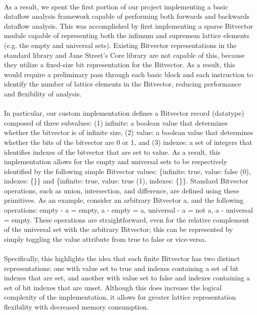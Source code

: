 \documentclass[letterpaper,11pt]{article}
\begin{document}
\paragraph{}
As a result, we spent the first portion of our project implementing a basic
dataflow analysis framework capable of performing both forwards and backwards
dataflow analysis. This was accomplished by first implementing a sparse
Bitvector module capable of representing both the infimum and supremem lattice
elements (e.g. the empty and universal sets). Existing Bitvector
representations in the standard library and Jane Street’s Core library are not
capable of this, because they utilize a fixed-size bit representation for the
Bitvector. As a result, this would require a preliminary pass through each
basic block and each instruction to identify the number of lattice elements in
the Bitvector, reducing performance and flexibility of analysis.

\paragraph{}
In particular, our custom implementation defines a Bitvector record (datatype)
composed of three subvalues: (1) infinite: a boolean value that determines
whether the bitvector is of infinite size, (2) value: a boolean value that
determines whether the bits of the bitvector are 0 or 1, and (3) indexes: a set
of integers that identifies indexes of the bitvector that are set to value. As
a result, this implementation allows for the empty and universal sets to be
respectively identified by the following simple Bitvector values: \{infinite:
true, value: false (0), indexes: \{\}\} and \{infinite: true, value: true (1),
indexes: \{\}\}. Standard Bitvector operations, such as union, intersection, and
difference, are defined using these primitives. As an example, consider an
arbitrary Bitvector a, and the following operations: empty - a = empty, a -
empty = a, universal - a = not a, a - universal = empty. These operations are
straightforward, even for the relative complement of the universal set with the
arbitrary Bitvector; this can be represented by simply toggling the value
attribute from true to false or vice-versa. 

\paragraph{}
Specifically, this highlights the idea that each finite Bitvector has two
distinct representations: one with value set to true and indexes containing a
set of bit indexes that are set, and another with value set to false and
indexes containing a set of bit indexes that are unset. Although this does
increase the logical complexity of the implementation, it allows for greater
lattice representation flexibility with decreased memory consumption.
\end{document}
